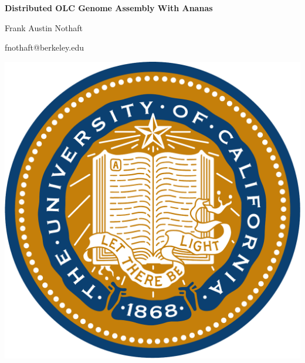 \documentclass[11pt]{a0poster}
\date{}
\begin{document}
\begin{minipage}{0.887\linewidth}
\vspace{100pt}
\hspace{100pt}
\color{Blue}
{\fontsize{3cm}{1em} \textbf{Distributed OLC Genome Assembly With Ananas}}

\hspace{100pt}
\huge Frank Austin Nothaft

\hspace{100pt}
\huge fnothaft@berkeley.edu
\vspace{100pt}
\end{minipage}
\begin{minipage}{0.113\linewidth}
\includegraphics[scale=0.6]{ucseal_540_139.pdf}
\end{minipage}

{\color{Blue}\noindent\makebox[\linewidth]{\rule{\paperwidth}{30pt}}}
\end{document}
